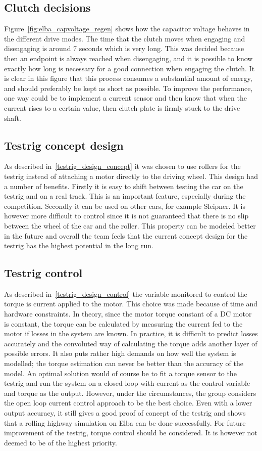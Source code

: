 \subsection{Clutch decisions}
Figure~\ref{fig:elba_capvoltage_regen} shows how the capacitor voltage behaves in the different drive modes.
The time that the clutch moves when engaging and disengaging is around 7 seconds which is very long. This was decided because then an endpoint is always reached when disengaging, and it is possible to know exactly how long is necessary 
for a good connection when engaging the clutch. It is clear in this figure that this process consumes a substantial 
amount of energy, and should preferably be kept as short as possible. To improve the performance, one way could be to implement a current sensor and then know that when the current rises to a certain value, then clutch plate is firmly stuck to the drive shaft.

\subsection{Testrig concept design}
As described in~\ref{testrig_design_concept} it was chosen to use rollers for the testrig instead of attaching a motor directly to the driving wheel. This design had a number of benefits. Firstly it is easy to shift between testing the car on the testrig and on a real track. This is an important feature, especially during the competition. Secondly it can be used on other cars, for example Sleipner. It is however more difficult to control since it is not guaranteed that there is no slip between the wheel of the car and the roller. This property can be modeled better in the future and overall the team feels that the current concept design for the testrig has the highest potential in the long run.

\subsection{Testrig control}
As described in~\ref{testrig_design_control} the variable monitored to control the torque is current applied to the motor. This choice was made because of time
and hardware constraints. In theory, since the motor torque constant of a DC motor is
constant, the torque can be calculated by measuring the current fed to the
motor if losses in the system are known. In practice, it is difficult to
predict losses accurately and the convoluted way of calculating the torque adds
another layer of possible errors. It also puts rather high demands on how well
the system is modelled; the torque estimation can never be better than the
accuracy of the model. An optimal solution would of course be to fit a torque
sensor to the testrig and run the system on a closed loop with current as the
control variable and torque as the output. However, under the
circumstances, the group considers the open loop current control approach to be
the best choice. Even with a lower output accuracy, it still gives a
good proof of concept of the testrig and shows that a rolling highway simulation
on Elba can be done successfully.
For future improvement of the testrig, torque control should be considered. It is however not deemed to be of the highest priority. %

